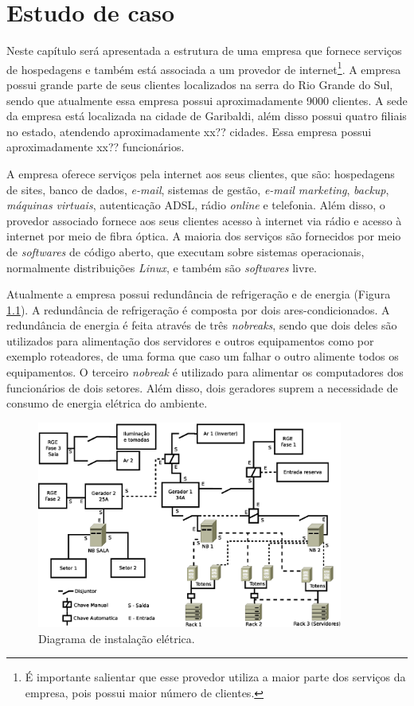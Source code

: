 \chapter{Estudo de caso}
\label{cap:estudodecaso}

Neste capítulo será apresentada a estrutura de uma empresa que fornece serviços de hospedagens e também está associada a um provedor de 
internet\footnote{É importante salientar que esse provedor utiliza a maior parte dos serviços da empresa, pois possui maior número de clientes.}. 
A empresa possui grande parte de seus clientes localizados na serra do Rio Grande do Sul, sendo que atualmente essa empresa possui 
aproximadamente 9000 clientes. A sede da empresa está localizada na cidade de Garibaldi, além disso possui quatro filiais no estado, 
atendendo aproximadamente xx?? cidades. Essa empresa possui aproximadamente xx?? funcionários.

A empresa oferece serviços pela internet aos seus clientes, que são: hospedagens de sites, banco de dados, \textit{e-mail}, sistemas de gestão, 
\textit{e-mail marketing}, \textit{backup}, \textit{máquinas virtuais}, autenticação \ac{ADSL}, rádio \textit{online} e telefonia.
Além disso, o provedor associado fornece aos seus clientes acesso à internet via rádio e acesso à internet por meio de fibra óptica.
A maioria dos serviços são fornecidos por meio de \textit{softwares} de código aberto, que executam sobre sistemas operacionais, normalmente 
distribuições \textit{Linux}, e também são \textit{softwares} livre.

Atualmente a empresa possui redundância de refrigeração e de energia (Figura \ref{fig:insteletrica}). A redundância de refrigeração é composta 
por dois ares-condicionados. 
A redundância de energia é feita através de três \textit{nobreaks}, sendo que dois deles são utilizados para alimentação dos servidores e outros 
equipamentos como por exemplo roteadores, de uma forma que caso um falhar o outro alimente todos os equipamentos. O terceiro \textit{nobreak} é 
utilizado para alimentar os computadores dos funcionários de dois setores. Além disso, dois geradores suprem a necessidade de consumo de 
energia elétrica do ambiente.

\begin{figure}[h!]
 \centering
 \includegraphics[width=380px]{img/insteletrica.eps}
 \caption{Diagrama de instalação elétrica.}
 \label{fig:insteletrica}
\end{figure}


